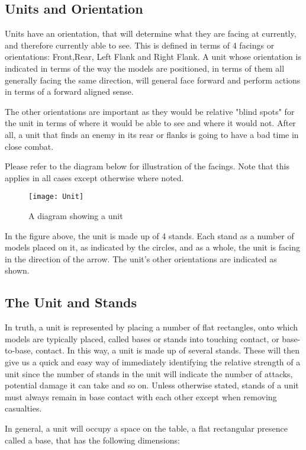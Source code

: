 \documentclass{article}
\begin{document}
\subsection{Units and Orientation}
Units have an orientation, that will determine what they are facing at currently, and therefore currently able to see. This is defined in terms of 4 facings or orientations: Front,Rear, Left Flank and Right Flank. A unit whose orientation is indicated in terms of the way the models are positioned, in terms of them all generally facing the same direction, will general face forward and perform actions in terms of a forward aligned sense.

The other orientations are important as they would be relative "blind spots" for the unit in terms of where it would be able to see and where it would not. After all, a unit that finds an enemy in its rear or flanks is going to have a bad time in close combat.

Please refer to the diagram below for illustration of the facings. Note that this applies in all cases except otherwise where noted.

\begin{figure}
\texttt{[image: Unit]}
\caption{A diagram showing a unit}
\end{figure}

In the figure above, the unit is made up of 4 stands. Each stand as a number of models placed on it, as indicated by the circles, and as a whole, the unit is facing in the direction of the arrow. The unit's other orientations are indicated as shown.

\subsection{The Unit and Stands}
In truth, a unit is represented by placing a number of flat rectangles, onto which models are typically placed, called bases or stands into touching contact, or base-to-base, contact. In this way, a unit is made up of several stands. These will then give us a quick and easy way of immediately identifying the relative strength of a unit since the number of stands in the unit will indicate the number of attacks, potential damage it can take and so on. Unless otherwise stated, stands of a unit must always remain in base contact with each other except when removing casualties.

In general, a unit will occupy a space on the table, a flat rectangular presence called a base, that has the following dimensions: 
\end{document}
